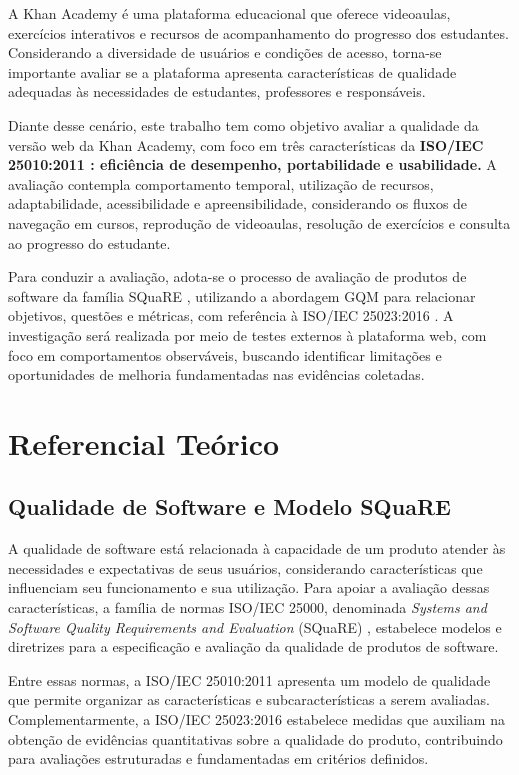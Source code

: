 \documentclass[sigconf, language=english, language=brazilian,natbib=false]{acmart}
\begin{document}
A Khan Academy é uma plataforma educacional que oferece videoaulas, exercícios interativos e recursos de acompanhamento do progresso dos estudantes. Considerando a diversidade de usuários e condições de acesso, torna-se importante avaliar se a plataforma apresenta características de qualidade adequadas às necessidades de estudantes, professores e responsáveis.

Diante desse cenário, este trabalho tem como objetivo avaliar a qualidade da versão web da Khan Academy, com foco em três características da \textbf{ISO/IEC 25010:2011 \cite{iso25010}: eficiência de desempenho, portabilidade e usabilidade.} A avaliação contempla comportamento temporal, utilização de recursos, adaptabilidade, acessibilidade e apreensibilidade, considerando os fluxos de navegação em cursos, reprodução de videoaulas, resolução de exercícios e consulta ao progresso do estudante.

Para conduzir a avaliação, adota-se o processo de avaliação de produtos de software da família SQuaRE \cite{iso25000,iso25040}, utilizando a abordagem GQM para relacionar objetivos, questões e métricas, com referência à ISO/IEC 25023:2016 \cite{iso25023}. A investigação será realizada por meio de testes externos à plataforma web, com foco em comportamentos observáveis, buscando identificar limitações e oportunidades de melhoria fundamentadas nas evidências coletadas.


\section{Referencial Teórico}

\subsection{Qualidade de Software e Modelo SQuaRE}

A qualidade de software está relacionada à capacidade de um produto atender às necessidades e expectativas de seus usuários, considerando características que influenciam seu funcionamento e sua utilização. Para apoiar a avaliação dessas características, a família de normas ISO/IEC 25000, denominada \textit{Systems and Software Quality Requirements and Evaluation} (SQuaRE) \cite{iso25000}, estabelece modelos e diretrizes para a especificação e avaliação da qualidade de produtos de software.

Entre essas normas, a ISO/IEC 25010:2011 \cite{iso25010} apresenta um modelo de qualidade que permite organizar as características e subcaracterísticas a serem avaliadas. Complementarmente, a ISO/IEC 25023:2016 \cite{iso25023} estabelece medidas que auxiliam na obtenção de evidências quantitativas sobre a qualidade do produto, contribuindo para avaliações estruturadas e fundamentadas em critérios definidos.
\end{document}
